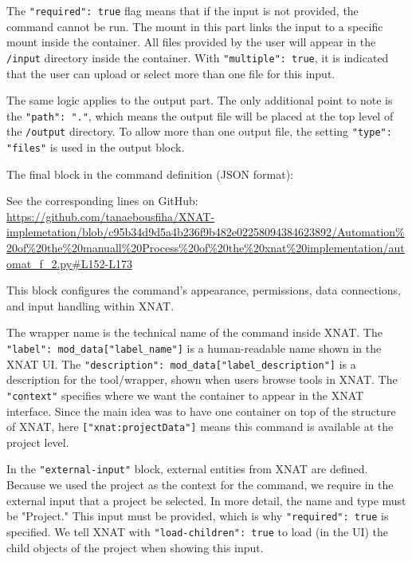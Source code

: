The \texttt{"required": true} flag means that if the input is not provided, the command cannot be run. The mount in this part links the input to a specific mount inside the container. All files provided by the user will appear in the \texttt{/input} directory inside the container. With \texttt{"multiple": true}, it is indicated that the user can upload or select more than one file for this input.

The same logic applies to the output part. The only additional point to note is the \texttt{"path": "."}, which means the output file will be placed at the top level of the \texttt{/output} directory. To allow more than one output file, the setting \texttt{"type": "files"} is used in the output block.

The final block in the command definition (JSON format):




\noindent\footnotesize See the corresponding lines on GitHub:\url{ https://github.com/tanaebousfiha/XNAT-implemetation/blob/c95b34d9d5a4b236f9b482e02258094384623892/Automation%20of%20the%20manuall%20Process%20of%20the%20xnat%20implementation/automat_f_2.py#L152-L173}




This block configures the command's appearance, permissions, data connections, and input handling within XNAT.

The wrapper name is the technical name of the command inside XNAT. The \texttt{"label": mod\_data["label\_name"]} is a human-readable name shown in the XNAT \ac{UI}. The \texttt{"description": mod\_data["label\_description"]} is a description for the tool/wrapper, shown when users browse tools in XNAT. The \texttt{"context"} specifies where we want the container to appear in the XNAT interface. Since the main idea was to have one container on top of the structure of XNAT, here \texttt{["xnat:projectData"]} means this command is available at the project level.


In the \texttt{"external-input"} block, external entities from XNAT are defined. Because we used the project as the context for the command, we require in the external input that a project be selected. In more detail, the name and type must be "Project." This input must be provided, which is why \texttt{"required": true} is specified. We tell XNAT with \texttt{"load-children": true} to load (in the UI) the child objects of the project when showing this input.

